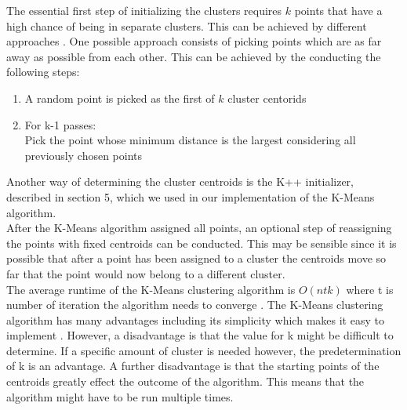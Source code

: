 The essential first step of initializing the clusters requires $k$ points that have a high chance of being in separate clusters. This can be achieved by different approaches . One possible approach consists of picking points which are as far away as possible from each other. This can be achieved by the conducting the following steps: \cite{MMDS}
\begin{enumerate}
	\item	A random point is picked as the first of $k$ cluster centorids
	\item	For k-1 passes: \\
	Pick the point whose minimum distance is the largest considering all previously chosen points
	
\end{enumerate}
Another way of determining the cluster centroids is the K++ initializer, described in section 5, which we used in our implementation of the K-Means algorithm.\\
After the K-Means algorithm assigned all points, an optional step of reassigning the points with fixed centroids can be conducted. This may be sensible since it is possible that after a point has been assigned to a cluster the centroids move so far that the point would now belong to a different cluster.\\
The average runtime of the K-Means clustering algorithm is $O(ntk)$ where t is number of iteration the algorithm needs to converge \cite{scikit-learn-extra}.
The K-Means clustering algorithm has many advantages including its simplicity which makes it easy to implement \cite{santini2016advantages}. However, a disadvantage is that the value for k might be difficult to determine. If a specific amount of cluster is needed however, the predetermination of k is an advantage. A further disadvantage is that the starting points of the centroids greatly effect the outcome of the algorithm. This means that the algorithm might have to be run multiple times.
